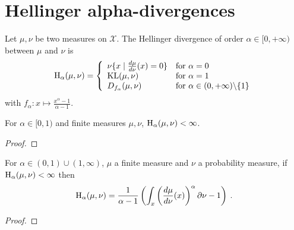 \section{Hellinger alpha-divergences}

\begin{definition}
  \label{def:hellingerAlpha}
  \leanok
  Let $\mu, \nu$ be two measures on $\mathcal X$. The Hellinger divergence of order $\alpha \in [0,+\infty)$ between $\mu$ and $\nu$ is
  \begin{align*}
  \operatorname{H}_\alpha(\mu, \nu) = \left\{
  \begin{array}{ll}
    \nu \{x \mid \frac{d\mu}{d\nu} (x) = 0\} & \text{for } \alpha = 0 \\
    \operatorname{KL}(\mu, \nu) & \text{for } \alpha = 1
    \\
    D_{f_\alpha}(\mu, \nu) & \text{for } \alpha \in (0,+\infty) \backslash \{1\}
  \end{array}\right.
  \end{align*}
  with $f_\alpha : x \mapsto \frac{x^{\alpha} - 1}{\alpha - 1}$.
\end{definition}


\begin{lemma}
  \label{lem:hellingerAlpha_ne_top_of_lt_one}
  \leanok
  For $\alpha \in [0, 1)$ and finite measures $\mu, \nu$, $\operatorname{H}_\alpha(\mu, \nu) < \infty$.
\end{lemma}

\begin{proof}\leanok
\uses{}
\end{proof}


\begin{lemma}
  \label{lem:hellingerAlpha_eq_integral}
  For $\alpha \in (0,1)\cup(1, \infty)$, $\mu$ a finite measure and $\nu$ a probability measure, if $\operatorname{H}_\alpha(\mu, \nu) < \infty$ then
  \begin{align*}
  \operatorname{H}_\alpha(\mu, \nu) = \frac{1}{\alpha - 1} \left( \int_x \left(\frac{d \mu}{d \nu}(x)\right)^\alpha \partial \nu - 1 \right)
  \: .
  \end{align*}
\end{lemma}

\begin{proof}%
\uses{}
\end{proof}


